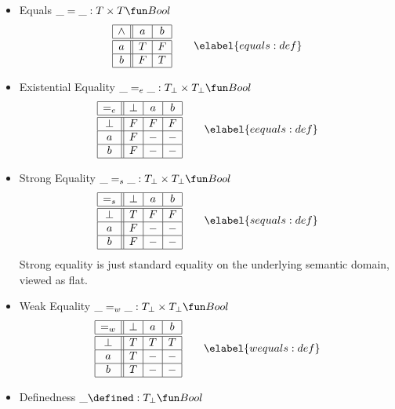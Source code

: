\begin{itemize}
\item Equals $\_=\_ : T\times T \fun Bool$
$$\begin{array}{|c||c|c|}
  \hline
  \land & a & b \\\hline\hline
  a     & T & F \\\hline
  b     & F & T \\\hline
\end{array}
\qquad \elabel{equals:def}
$$
%
\item Existential Equality\cite{CMR99} $\_=_e\_ : T_\bot\times T_\bot \fun Bool$
$$\begin{array}{|c||c|c|c|}
  \hline
  =_e   & \bot & a & b \\\hline\hline
  \bot  & F & F & F \\\hline
  a     & F & - & - \\\hline
  b     & F & - & - \\\hline
\end{array}
\qquad \elabel{eequals:def}
$$
%
\item Strong Equality\cite{CMR99} $\_=_s\_ : T_\bot\times T_\bot \fun Bool$
$$\begin{array}{|c||c|c|c|}
  \hline
  =_s   & \bot & a & b \\\hline\hline
  \bot  & T & F & F \\\hline
  a     & F & - & - \\\hline
  b     & F & - & - \\\hline
\end{array}
\qquad \elabel{sequals:def}
$$
Strong equality is just standard equality on the underlying
semantic domain, viewed as flat.
%
\item Weak Equality\cite{CMR99} $\_=_w\_ : T_\bot\times T_\bot \fun Bool$
$$\begin{array}{|c||c|c|c|}
  \hline
  =_w   & \bot & a & b \\\hline\hline
  \bot  & T & T & T \\\hline
  a     & T & - & - \\\hline
  b     & T & - & - \\\hline
\end{array}
\qquad \elabel{wequals:def}
$$
%
\item Definedness $\_\defined : T_\bot \fun Bool$
\end{itemize}

